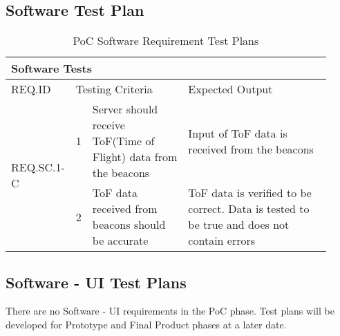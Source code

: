 \subsection{Software Test Plan}

\begin{table}[h!]
    \centering
    \begin{tabular}{|m{0.15\linewidth}|m{0.02\linewidth}|m{0.3\linewidth}|m{0.45\linewidth}|} 
    \hline
    \multicolumn{4}{|l|}{Software Tests }           \\ 
    \hline
    REQ.ID      & \multicolumn{2}{l|}{Testing Criteria}      & Expected Output          \\ 
    \hline
    \multirow{2}{*}{REQ.SC.1-C} & 1 
    & Server should receive ToF(Time of Flight) data from the beacons
    & Input of ToF data is received from the beacons        \\ 
    \cline{2-4}
    & 2 
    & ToF data received from beacons should be accurate  
    & ToF data is verified to be correct. Data is tested to be true and does not contain errors   \\
    \hline 
\end{tabular}
	\caption{PoC Software Requirement Test Plans}
\end{table}

\subsection{Software - UI Test Plans}

There are no Software - UI requirements in the PoC phase. Test plans will be developed for Prototype and 
Final Product phases at a later date.

